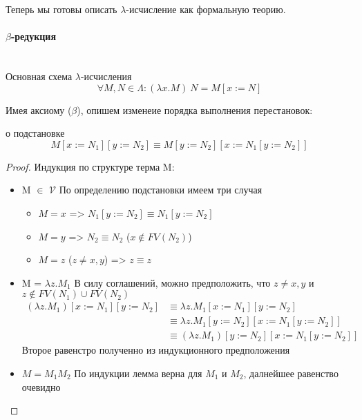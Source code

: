 \documentclass[lambda.tex]{subfiles}
\begin{document}

Теперь мы готовы описать $\lambda$-исчисление как формальную теорию.\\

\paragraph{$\beta$-редукция} %
\label{par:beta reduction}
~\\
Основная схема $\lambda$-исчисления
\begin{equation*}
\forall M, N \in \Lambda : (\lambda x.M)\ N = M[x := N]\tag{$\beta$}
\end{equation*}

Имея аксиому ($\beta$), опишем изменеие порядка выполнения перестановок:
\begin{lemma}{о подстановке}
\begin{equation*}
	M[x := N_1][y := N_2] \equiv M[y := N_2][x := N_1[y := N_2]]
\end{equation*}
\end{lemma}
\begin{proof}
	Индукция по структуре терма M: \\
	\begin{itemize}
		\item M $\in$ $\mathcal{V}$ По определению подстановки имеем три случая
		\begin{itemize}
		 	\item $M = x$ => $N_1[y := N_2] \equiv N_1[y := N_2]$
		 	\item $M = y$ => $N_2 \equiv N_2$ ($x\not\in FV(N_2)$)
		 	\item $M = z$ ($z \neq x, y$) => $z \equiv z$
		 \end{itemize}
		 \item M = $\lambda z.M_1$
		 В силу соглашений, можно предположить, что $z \neq x,y$ и $z\not\in FV(N_1) \cup FV(N_2)$
		 \begin{align*}
		 			 (\lambda z.M_1)[x := N_1][y := N_2] 
		 			 &\equiv \lambda z.M_1[x := N_1][y := N_2]\\
		 			 &\equiv \lambda z.M_1[y := N_2][x := N_1[y := N_2]] \\
		 			 &\equiv (\lambda z.M_1)[y := N_2][x := N_1[y := N_2]]
		 \end{align*}
		 Второе равенстро полученно из индукционного предположения
		 \item $M = M_1 M_2$
		 По индукции лемма верна для $M_1$ и $M_2$, далнейшее равенство очевидно
	\end{itemize}
\end{proof}
\end{document}
